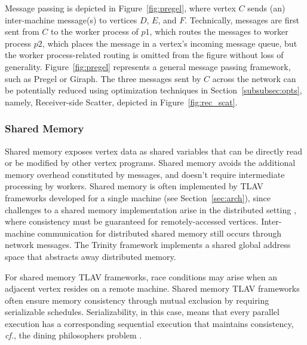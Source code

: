 \documentclass[reprint,twocolumn,showpacs,preprintnumbers,amsmath, aps,pre,amssymb]{revtex4-1}
\begin{document}
Message passing is depicted in Figure~\ref{fig:pregel}, where vertex $C$ sends (an) inter-machine message(s) to vertices $D$, $E$, and $F$.  Technically, messages are first sent from $C$ to the worker process of $p1$, which routes the messages to worker process $p2$, which places the message in a vertex's incoming message queue, but the worker process-related routing is omitted from the figure without loss of generality.  Figure~\ref{fig:pregel} represents a general message passing framework, such as Pregel or Giraph.  The three messages sent by $C$ across the network can be potentially reduced using optimization techniques in Section~\ref{subsubsec:opts}, namely, Receiver-side Scatter, depicted in Figure~\ref{fig:rec_scat}.  

\subsubsection{Shared Memory}
\label{subsubsec:shared}

Shared memory exposes vertex data as shared variables that can be directly read or be modified by other vertex programs.  Shared memory avoids the additional memory overhead constituted by messages, and doesn't require intermediate processing by workers.  Shared memory is often implemented by TLAV frameworks developed for a single machine (see Section~\ref{sec:arch}), since challenges to a shared memory implementation arise in the distributed setting \cite{Protic1998,Nitzberg1991}, where consistency must be guaranteed for remotely-accessed vertices.  Inter-machine communication for distributed shared memory still occurs through network messages.  The Trinity framework \cite{Shao2013} implements a shared global address space that abstracts away distributed memory.

For shared memory TLAV frameworks, race conditions may arise when an adjacent vertex resides on a remote machine.  Shared memory TLAV frameworks often ensure memory consistency through mutual exclusion by requiring serializable schedules. Serializability, in this case, means that every parallel execution has a corresponding sequential execution that maintains consistency, {\em cf.}, the dining philosophers problem \cite{Low2012,Gonzalez2012}.  
\end{document}
